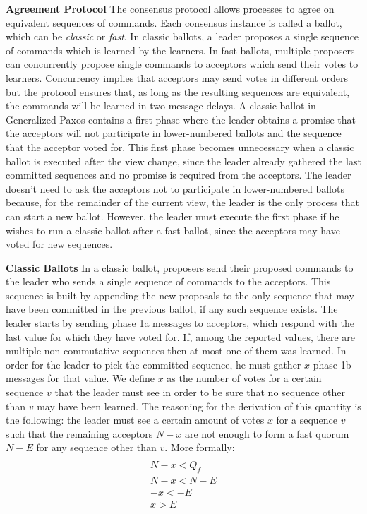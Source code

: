 \textbf{Agreement Protocol} The consensus protocol allows processes to agree on equivalent sequences of commands. Each consensus instance is called a ballot, which can be \textit{classic} or \textit{fast}. In classic ballots, a leader proposes a single sequence of commands which is learned by the learners. In fast ballots, multiple proposers can concurrently propose single commands to acceptors which send their votes to learners. Concurrency implies that acceptors may send votes in different orders but the protocol ensures that, as long as the resulting sequences are equivalent, the commands will be learned in two message delays. A classic ballot in Generalized Paxos contains a first phase where the leader obtains a promise that the acceptors will not participate in lower-numbered ballots and the sequence that the acceptor voted for. This first phase becomes unnecessary when a classic ballot is executed after the view change, since the leader already gathered the last committed sequences and no promise is required from the acceptors. The leader doesn't need to ask the acceptors not to participate in lower-numbered ballots because, for the remainder of the current view, the leader is the only process that can start a new ballot.  However, the leader must execute the first phase if he wishes to run a classic ballot after a fast ballot, since the acceptors may have voted for new sequences. \par
\textbf{Classic Ballots} In a classic ballot, proposers send their proposed commands to the leader who sends a single sequence of commands to the acceptors. This sequence is built by appending the new proposals to the only sequence that may have been committed in the previous ballot, if any such sequence exists. The leader starts by sending phase 1a messages to acceptors, which respond with the last value for which they have voted for. If, among the reported values, there are multiple non-commutative sequences then at most one of them was learned. In order for the leader to pick the committed sequence, he must gather $x$ phase 1b messages for that value. We define $x$ as the number of votes for a certain sequence $v$ that the leader must see in order to be sure that no sequence other than $v$ may have been learned. The reasoning for the derivation of this quantity is the following: the leader must see a certain amount of votes $x$ for a sequence $v$ such that the remaining acceptors $N-x$ are not enough to form a fast quorum $N-E$ for any sequence other than $v$. More formally: 
\begin{gather*} \\
N - x < Q_f \label{eq_1} \tag{1} \\ 
N - x < N - E \label{eq_2} \tag{2} \\
-x < -E \label{eq_3} \tag{3} \\
x > E \label{eq_4} \tag{4} \\
\end{gather*}

